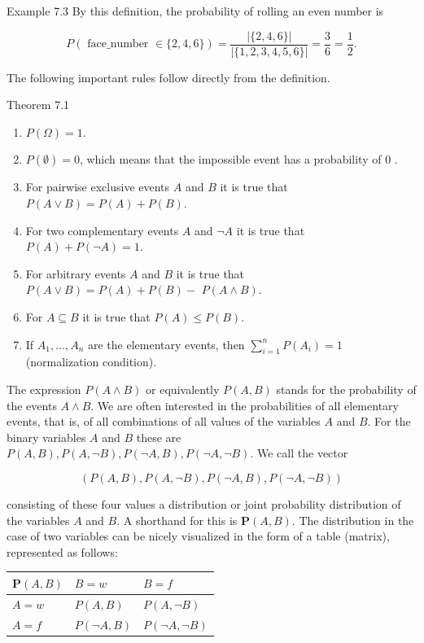 \documentclass[10pt]{book}
\begin{document}
Example 7.3 By this definition, the probability of rolling an even number is

$$
P(\text { face_number } \in\{2,4,6\})=\frac{|\{2,4,6\}|}{|\{1,2,3,4,5,6\}|}=\frac{3}{6}=\frac{1}{2} .
$$

The following important rules follow directly from the definition.

Theorem 7.1
\begin{enumerate}
  \item $P(\Omega)=1$.
  \item $P(\emptyset)=0$, which means that the impossible event has a probability of 0 .
  \item For pairwise exclusive events $A$ and $B$ it is true that $P(A \vee B)=P(A)+P(B)$.
  \item For two complementary events $A$ and $\neg A$ it is true that $P(A)+P(\neg A)=1$.
  \item For arbitrary events $A$ and $B$ it is true that $P(A \vee B)=P(A)+P(B)-$ $P(A \wedge B)$.
  \item For $A \subseteq B$ it is true that $P(A) \leq P(B)$.
  \item If $A_{1}, \ldots, A_{n}$ are the elementary events, then $\sum_{i=1}^{n} P\left(A_{i}\right)=1$ (normalization condition).
\end{enumerate}

The expression $P(A \wedge B)$ or equivalently $P(A, B)$ stands for the probability of the events $A \wedge B$. We are often interested in the probabilities of all elementary events, that is, of all combinations of all values of the variables $A$ and $B$. For the binary variables $A$ and $B$ these are $P(A, B), P(A, \neg B), P(\neg A, B), P(\neg A, \neg B)$. We call the vector

$$
(P(A, B), P(A, \neg B), P(\neg A, B), P(\neg A, \neg B))
$$

consisting of these four values a distribution or joint probability distribution of the variables $A$ and $B$. A shorthand for this is $\boldsymbol{P}(A, B)$. The distribution in the case of two variables can be nicely visualized in the form of a table (matrix), represented as follows:

\begin{center}
\begin{tabular}{lll}
\hline
$\boldsymbol{P}(A, B)$ & $B=w$ & $B=f$ \\
\hline
$A=w$ & $P(A, B)$ & $P(A, \neg B)$ \\
\hline
$A=f$ & $P(\neg A, B)$ & $P(\neg A, \neg B)$ \\
\hline
\end{tabular}
\end{center}
\end{document}
